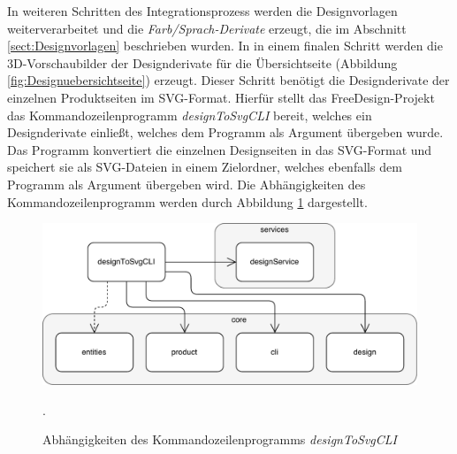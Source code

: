 In weiteren Schritten des Integrationsprozess werden die Designvorlagen weiterverarbeitet und die \emph{Farb/Sprach-Derivate} erzeugt, die im Abschnitt \ref{sect:Designvorlagen} beschrieben wurden. In in einem finalen Schritt werden die 3D-Vorschaubilder der Designderivate für die Übersichtseite (Abbildung \ref{fig:Designuebersichtseite}) erzeugt. Dieser Schritt benötigt die Designderivate der einzelnen Produktseiten im SVG-Format. Hierfür stellt das FreeDesign-Projekt das Kommandozeilenprogramm \emph{designToSvgCLI} bereit, welches ein Designderivate einließt, welches dem Programm als Argument übergeben wurde. Das Programm konvertiert die einzelnen Designseiten in das SVG-Format und speichert sie als SVG-Dateien in einem Zielordner, welches ebenfalls dem Programm als Argument übergeben wird. 
Die Abhängigkeiten des Kommandozeilenprogramm werden durch Abbildung \ref{fig:DesignToSvg} dargestellt.

\begin{figure}[H]
    \centering
    \includegraphics[width=.9\textwidth]{diagrams/Ist-Architektur/designToSvgCLI-analysis.pdf}
    \caption{Abhängigkeiten des Kommandozeilenprogramms \emph{designToSvgCLI}}.
    \label{fig:DesignToSvg}
\end{figure}

